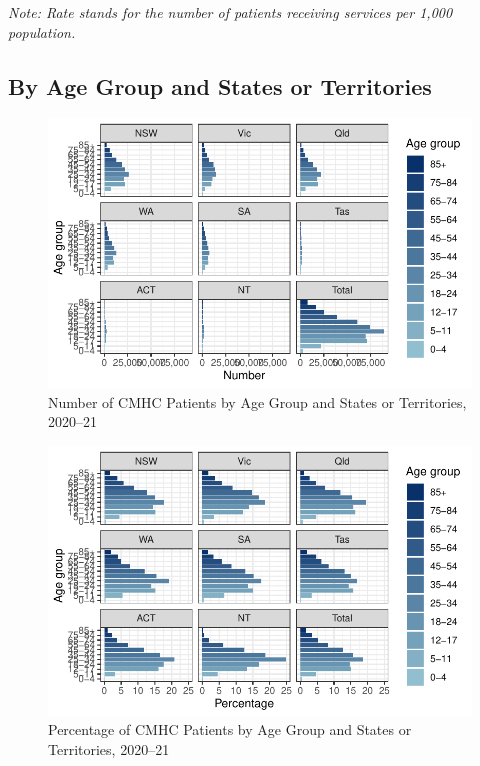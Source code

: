 \documentclass[
  a4paper,
  DIV=11,
  numbers=noendperiod]{scrreport}
\begin{document}
\emph{Note: Rate stands for the number of patients receiving services
per 1,000 population.}

\hypertarget{by-age-group-and-states-or-territories}{%
\subsection{By Age Group and States or
Territories}\label{by-age-group-and-states-or-territories}}

\begin{figure}

\caption{\label{fig-cmhc-asn}Number of CMHC Patients by Age Group and
States or Territories, 2020--21}

{\centering \includegraphics{./chap2-cmhc_files/figure-pdf/fig-cmhc-asn-1.pdf}

}

\end{figure}

\begin{figure}

\caption{\label{fig-cmhc-asp}Percentage of CMHC Patients by Age Group
and States or Territories, 2020--21}

{\centering \includegraphics{./chap2-cmhc_files/figure-pdf/fig-cmhc-asp-1.pdf}

}

\end{figure}
\end{document}
